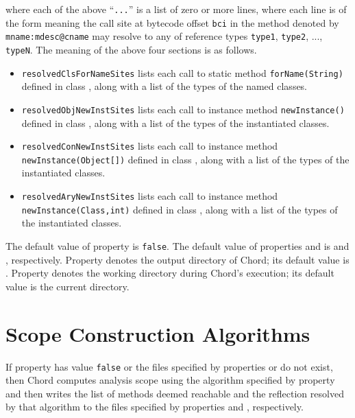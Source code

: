 where each of the above ``{\tt ...}'' is a list of zero or more lines, where
each line is of the form
meaning the call site at bytecode offset {\tt bci} in the
method denoted by {\tt mname:mdesc@cname} may resolve to any of
reference types {\tt type1}, {\tt type2}, ..., {\tt typeN}.
The meaning of the above four sections is as follows.
\begin{itemize}
\item {\tt resolvedClsForNameSites} lists
each call to static method {\tt forName(String)} defined in class
, along with a list of the types of the named
classes.
\item {\tt resolvedObjNewInstSites} lists
each call to instance method {\tt newInstance()} defined in class
, along with a list of the types of the
instantiated classes.
\item {\tt resolvedConNewInstSites} lists
each call to instance method {\tt newInstance(Object[])} defined in class
, along with a list of the types of the
instantiated classes.
\item {\tt resolvedAryNewInstSites} lists
each call to instance method {\tt newInstance(Class,int)} defined in class
, along with a list of the types of the
instantiated classes.
\end{itemize}
The default value of property  is {\tt false}.
The default value of properties  and
 is  and
, respectively.
Property  denotes the output directory of Chord;
its default value is .
Property  denotes the working directory during
Chord's execution; its default value is the current directory.

\section{Scope Construction Algorithms}
\label{sec:scope-algos}

If property  has value {\tt false} or the
files specified by properties  or
 do not exist, then Chord computes analysis
scope using the algorithm specified by property
 and then writes the list of methods deemed
reachable and the reflection resolved by that algorithm to the files
specified by properties  and
, respectively.

